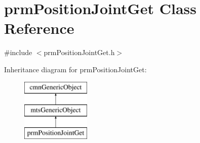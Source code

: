 \hypertarget{classprm_position_joint_get}{\section{prm\-Position\-Joint\-Get Class Reference}
\label{classprm_position_joint_get}
}


{\ttfamily \#include $<$prm\-Position\-Joint\-Get.\-h$>$}

Inheritance diagram for prm\-Position\-Joint\-Get\-:\begin{figure}[H]
\begin{center}
\leavevmode
\includegraphics[height=3.000000cm]{d3/d01/classprm_position_joint_get}
\end{center}
\end{figure}
